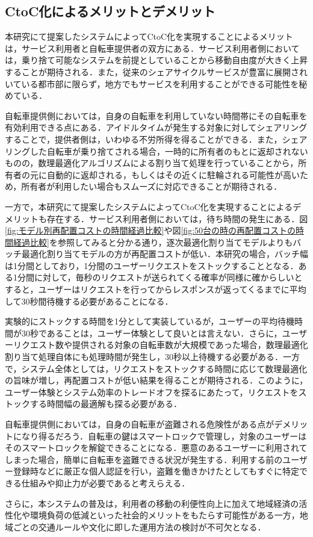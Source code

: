   \subsection{CtoC化によるメリットとデメリット}
    \label{sec:CtoC化によるメリットとデメリット}
      \par 本研究にて提案したシステムによってCtoC化を実現することによるメリットは，サービス利用者と自転車提供者の双方にある．サービス利用者側においては，乗り捨て可能なシステムを前提としていることから移動自由度が大きく上昇することが期待される．また，従来のシェアサイクルサービスが豊富に展開されいている都市部に限らず，地方でもサービスを利用することができる可能性を秘めている．
      \par 自転車提供側においては，自身の自転車を利用していない時間帯にその自転車を有効利用できる点にある．アイドルタイムが発生する対象に対してシェアリングすることで，提供者側は，いわゆる不労所得を得ることができる．また，シェアリングした自転車が乗り捨てされる場合，一時的に所有者のもとに返却されないものの，数理最適化アルゴリズムによる割り当て処理を行っていることから，所有者の元に自動的に返却される，もしくはその近くに駐輪される可能性が高いため，所有者が利用したい場合もスムーズに対応できることが期待される．
      \par 一方で，本研究にて提案したシステムによってCtoC化を実現することによるデメリットも存在する．サービス利用者側においては，待ち時間の発生にある．図\ref{fig:モデル別再配置コストの時間経過比較}や図\ref{fig:50台の時の再配置コストの時間経過比較}を参照してみると分かる通り，逐次最適化割り当てモデルよりもバッチ最適化割り当てモデルの方が再配置コストが低い．本研究の場合，バッチ幅は1分間としており，1分間のユーザーリクエストをストックすることとなる．ある1分間に対して，毎秒のリクエストが送られてくる確率が同様に確からしいとすると，ユーザーはリクエストを行ってからレスポンスが返ってくるまでに平均して30秒間待機する必要があることになる．
      \par 実験的にストックする時間を1分として実装しているが，ユーザーの平均待機時間が30秒であることは，ユーザー体験として良いとは言えない．さらに，ユーザーリクエスト数や提供される対象の自転車数が大規模であった場合，数理最適化割り当て処理自体にも処理時間が発生し，30秒以上待機する必要がある．一方で，システム全体としては，リクエストをストックする時間に応じて数理最適化の旨味が増し，再配置コストが低い結果を得ることが期待される．このように，ユーザー体験とシステム効率のトレードオフを探るにあたって，リクエストをストックする時間幅の最適解も探る必要がある．
      \par 自転車提供側においては，自身の自転車が盗難される危険性がある点がデメリットになり得るだろう．自転車の鍵はスマートロックで管理し，対象のユーザーはそのスマートロックを解錠できることになる．悪意のあるユーザーに利用されてしまった場合，簡単に自転車を盗難できる状況が発生する．利用する前のユーザー登録時などに厳正な個人認証を行い，盗難を働きかけたとしてもすぐに特定できる仕組みや抑止力が必要であると考えらえる．
      \par さらに，本システムの普及は，利用者の移動の利便性向上に加えて地域経済の活性化や環境負荷の低減といった社会的メリットをもたらす可能性がある一方，地域ごとの交通ルールや文化に即した運用方法の検討が不可欠となる．
      
